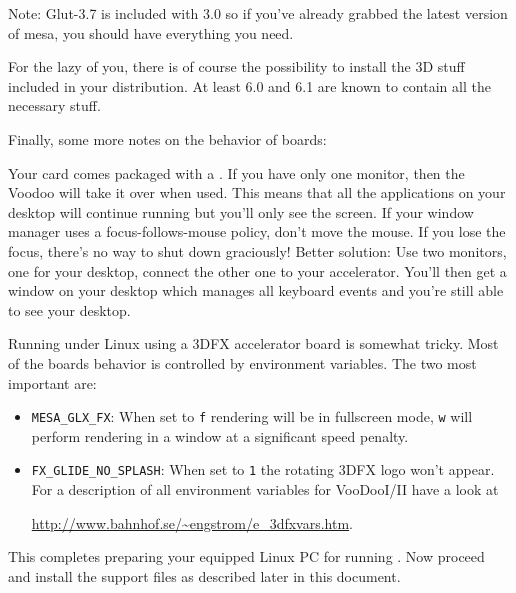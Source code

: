  \noindent
Note: Glut-3.7 is included with  3.0 so if you've already grabbed the latest
version of mesa, you should have everything you need.


For the lazy of you, there is of course the possibility to install the 3D stuff included
in your distribution. At least  6.0 and  6.1 are known to
contain all the necessary stuff.

Finally, some more notes on the behavior of  boards:

Your card comes packaged with a . If you
have only one monitor, then the Voodoo will take it over when
used. This means that all the applications on your desktop will
continue running but you'll only see the \FlightGear screen. If
your window manager uses a focus-follows-mouse policy, don't move
the mouse. If you lose the focus, there's no way to shut down
\FlightGear graciously! Better solution: Use two monitors, one for
your desktop, connect the other one to your accelerator. You'll
then get a window on your desktop which manages all keyboard
events and you're still able to see your desktop.

Running \FlightGear under Linux using a 3DFX accelerator board is
somewhat tricky. Most of the boards behavior is controlled by
environment variables. The two most
important are:

\begin{itemize}

\item{\texttt{MESA\_GLX\_FX}}: When set to \texttt{f} rendering will be in
  fullscreen mode,
  \texttt{w} will perform rendering in a window at a significant speed penalty.

\item {\texttt{FX\_GLIDE\_NO\_SPLASH}}:
  When set to \texttt{1} the rotating 3DFX logo
  won't appear. For a description of all environment
  variables for  VooDooI/II have a look at

\href{http://www.bahnhof.se/~engstrom/e_3dfxvars.htm}{http://www.bahnhof.se/\~{}engstrom/e\_3dfxvars.htm}.

\end{itemize}

This completes preparing your  equipped Linux PC for running
\FlightGear\hspace{-1mm}.
Now proceed and install the support files as described later in this document.

